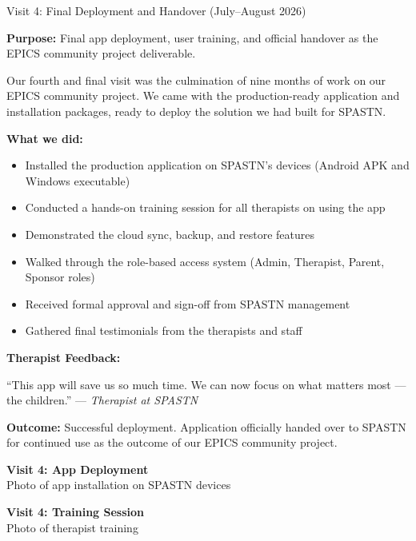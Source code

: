 \documentclass[11pt,a4paper]{article}
\begin{document}
\begin{visitbox}[visitorange]{Visit 4: Final Deployment and Handover (July--August 2026)}

\textbf{Purpose:} Final app deployment, user training, and official handover as the EPICS community project deliverable.

Our fourth and final visit was the culmination of nine months of work on our EPICS community project. We came with the production-ready application and installation packages, ready to deploy the solution we had built for SPASTN.

\textbf{What we did:}
\begin{itemize}[leftmargin=1.5em, itemsep=2pt]
    \item Installed the production application on SPASTN's devices (Android APK and Windows executable)
    \item Conducted a hands-on training session for all therapists on using the app
    \item Demonstrated the cloud sync, backup, and restore features
    \item Walked through the role-based access system (Admin, Therapist, Parent, Sponsor roles)
    \item Received formal approval and sign-off from SPASTN management
    \item Gathered final testimonials from the therapists and staff
\end{itemize}

\textbf{Therapist Feedback:}
\begin{quotecallout}
``This app will save us so much time. We can now focus on what matters most --- the children.'' --- \textit{Therapist at SPASTN}
\end{quotecallout}

\textbf{Outcome:} Successful deployment. Application officially handed over to SPASTN for continued use as the outcome of our EPICS community project.

\vspace{0.3cm}
\begin{minipage}{0.48\textwidth}
    \begin{photoplaceholder}[height=4.5cm]
        \vspace{1.2cm}
        {\small\bfseries Visit 4: App Deployment}\\[0.2cm]
        {\footnotesize Photo of app installation on SPASTN devices}
    \end{photoplaceholder}
\end{minipage}
\hfill
\begin{minipage}{0.48\textwidth}
    \begin{photoplaceholder}[height=4.5cm]
        \vspace{1.2cm}
        {\small\bfseries Visit 4: Training Session}\\[0.2cm]
        {\footnotesize Photo of therapist training}
    \end{photoplaceholder}
\end{minipage}

\end{visitbox}
\end{document}
